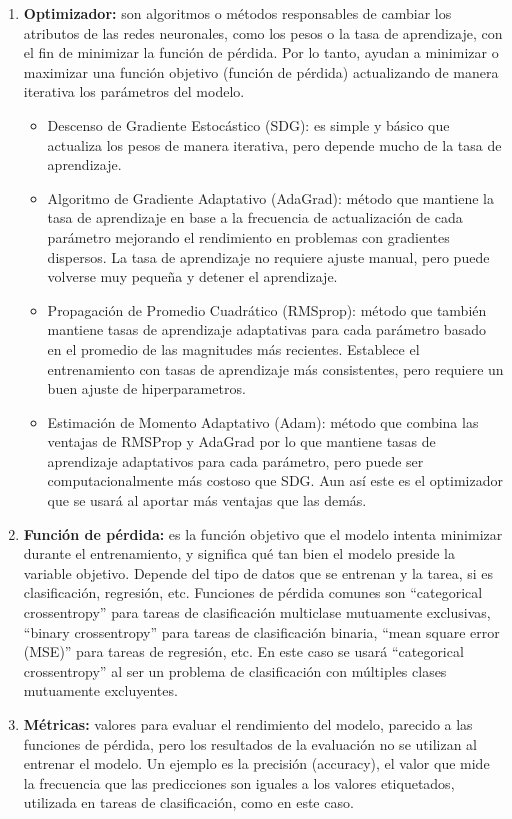 \documentclass[12pt]{report} %
\begin{document}
\begin{enumerate}

    \item \textbf{Optimizador:} son algoritmos o métodos responsables de cambiar los atributos de las redes neuronales, como los pesos o la tasa de aprendizaje, con el fin de minimizar la función de pérdida. Por lo tanto, ayudan a minimizar o maximizar una función objetivo (función de pérdida) actualizando de manera iterativa los parámetros del modelo.
		\begin{itemize}
			\item Descenso de Gradiente Estocástico (SDG): es simple y básico que actualiza los pesos de manera iterativa, pero depende mucho de la tasa de aprendizaje. 
			\item Algoritmo de Gradiente Adaptativo (AdaGrad): método que mantiene la tasa de aprendizaje en base a la frecuencia de actualización de cada parámetro mejorando el rendimiento en problemas con gradientes dispersos. La tasa de aprendizaje no requiere ajuste manual, pero puede volverse muy pequeña y detener el aprendizaje.
			\item Propagación de Promedio Cuadrático (RMSprop): método que también mantiene tasas de aprendizaje adaptativas para cada parámetro basado en el promedio de las magnitudes más recientes. Establece el entrenamiento con tasas de aprendizaje más consistentes, pero requiere un buen ajuste de hiperparametros.
			\item Estimación de Momento Adaptativo (Adam): método que combina las ventajas de RMSProp y AdaGrad por lo que mantiene tasas de aprendizaje adaptativos para cada parámetro, pero puede ser computacionalmente más costoso que SDG. Aun así este es el optimizador que se usará al aportar más ventajas que las demás.
		\end{itemize}
    \item \textbf{Función de pérdida:} es la función objetivo que el modelo intenta minimizar durante el entrenamiento, y significa qué tan bien el modelo preside la variable objetivo. Depende del tipo de datos que se entrenan y la tarea, si es clasificación, regresión, etc. Funciones de pérdida comunes son “categorical crossentropy” para tareas de clasificación multiclase mutuamente exclusivas, “binary crossentropy” para tareas de clasificación binaria, “mean square error (MSE)” para tareas de regresión, etc. En este caso se usará “categorical crossentropy” al ser un problema de clasificación con múltiples clases mutuamente excluyentes.
    \item \textbf{Métricas:} valores para evaluar el rendimiento del modelo, parecido a las funciones de pérdida, pero los resultados de la evaluación no se utilizan al entrenar el modelo. Un ejemplo es la precisión (accuracy), el valor que mide la frecuencia que las predicciones son iguales a los valores etiquetados, utilizada en tareas de clasificación, como en este caso.

\end{enumerate}
\end{document}
